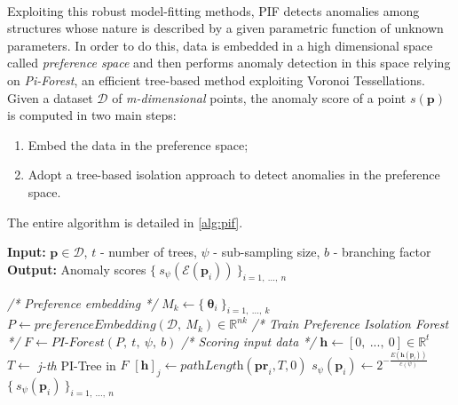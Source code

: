 \paragraph{}
Exploiting this robust model-fitting methods, PIF detects anomalies among structures whose nature is described by a given parametric function of unknown parameters. In order to do this, data is embedded in a high dimensional space called \textit{preference space} and then performs anomaly detection in this space relying on \textit{Pi-Forest}, an efficient tree-based method exploiting Voronoi Tessellations.
Given a dataset $\mathcal{D}$ of \textit{m-dimensional} points, the anomaly score of a point $s(\textbf{p})$ is computed in two main steps:
\begin{enumerate}[label=(\roman*)]
    \item Embed the data in the preference space;
    \item Adopt a tree-based isolation approach to detect anomalies in the preference space.
\end{enumerate}
The entire algorithm is detailed in \ref{alg:pif}.

\begin{algorithm}[h!]
    \caption{$PIF$}
    \label{alg:pif}
    \textbf{Input:} $\textbf{p} \in \mathcal{D}$, $t$ - number of trees, $\psi$ - sub-sampling size, $b$ - branching factor \\
    \textbf{Output:} Anomaly scores $\{\ s_\psi(\mathcal{E}(\textbf{p}_i))\ \}_{i=1,\ ...,\ n}$
    \begin{algorithmic}[1]
        \State \textit{/* Preference embedding */}
        \State $M_k \gets \{\ \bm{\theta}_i \ \}_{i=1,\ ...,\ k}$ 
        \State $P \gets preferenceEmbedding(\mathcal{D},\ M_k) \in \mathbb{R}^{nk}$
        \State
        \State \textit{/* Train Preference Isolation Forest */}
        \State $F \gets \textit{PI-Forest}(P,\ t,\ \psi,\ b)$
        \State
        \State \textit{/* Scoring input data */}
            \State $\textbf{h} \gets [0,\ ...,\ 0] \in \mathbb{R}^t$
                \State $T \gets $ \textit{j-th} PI-Tree in $F$
                \State $[\textbf{h}]_j \gets \textit{pathLength}(\textbf{pr}_i, T, 0)$ 
            \EndFor
            \State $s_\psi(\textbf{p}_i) \gets 2^{- \frac{E(\textbf{h}(\textbf{p}_i))}{c(\psi)}}$
        \EndFor
        \State \Return $\{\ s_\psi(\textbf{p}_i) \ \}_{i=1,\ ...,\ n}$
    \end{algorithmic}
\end{algorithm}


